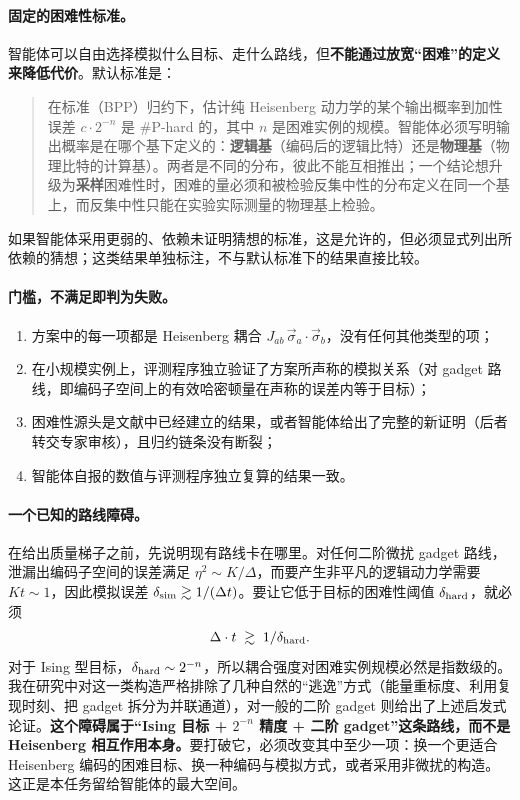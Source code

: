 \documentclass[11pt,a4paper,fontset=none]{ctexart}
\newcommand{\Heis}{\vec\sigma_a\!\cdot\!\vec\sigma_b}
\begin{document}
\paragraph{固定的困难性标准。}智能体可以自由选择模拟什么目标、走什么路线，但\textbf{不能通过放宽“困难”的定义来降低代价}。默认标准是：
\begin{quote}
在标准（BPP）归约下，估计纯 Heisenberg 动力学的某个输出概率到加性误差 $c\cdot 2^{-n}$ 是 \#P-hard 的，其中 $n$ 是困难实例的规模。智能体必须写明输出概率是在哪个基下定义的：\textbf{逻辑基}（编码后的逻辑比特）还是\textbf{物理基}（物理比特的计算基）。两者是不同的分布，彼此不能互相推出；一个结论想升级为\textbf{采样}困难性时，困难的量必须和被检验反集中性的分布定义在同一个基上，而反集中性只能在实验实际测量的物理基上检验。
\end{quote}
\noindent 如果智能体采用更弱的、依赖未证明猜想的标准，这是允许的，但必须显式列出所依赖的猜想；这类结果单独标注，不与默认标准下的结果直接比较。

\paragraph{门槛，不满足即判为失败。}
\begin{enumerate}[label=(\alph*)]
  \item 方案中的每一项都是 Heisenberg 耦合 $J_{ab}\,\Heis$，没有任何其他类型的项；
  \item 在小规模实例上，评测程序独立验证了方案所声称的模拟关系（对 gadget 路线，即编码子空间上的有效哈密顿量在声称的误差内等于目标）；
  \item 困难性源头是文献中已经建立的结果，或者智能体给出了完整的新证明（后者转交专家审核），且归约链条没有断裂；
  \item 智能体自报的数值与评测程序独立复算的结果一致。
\end{enumerate}

\paragraph{一个已知的路线障碍。}在给出质量梯子之前，先说明现有路线卡在哪里。对任何二阶微扰 gadget 路线，泄漏出编码子空间的误差满足 $\eta^2\sim K/\Delta$，而要产生非平凡的逻辑动力学需要 $Kt\sim 1$，因此模拟误差 $\delta_{\rm sim}\gtrsim 1/(\Delta t)$。要让它低于目标的困难性阈值 $\delta_{\rm hard}$，就必须
\[
  \Delta\cdot t \;\gtrsim\; 1/\delta_{\rm hard}.
\]
对于 Ising 型目标，$\delta_{\rm hard}\sim 2^{-n}$，所以耦合强度对困难实例规模必然是指数级的。我在研究中对这一类构造严格排除了几种自然的“逃逸”方式（能量重标度、利用复现时刻、把 gadget 拆分为并联通道），对一般的二阶 gadget 则给出了上述启发式论证。\textbf{这个障碍属于“Ising 目标 + $2^{-n}$ 精度 + 二阶 gadget”这条路线，而不是 Heisenberg 相互作用本身。}要打破它，必须改变其中至少一项：换一个更适合 Heisenberg 编码的困难目标、换一种编码与模拟方式，或者采用非微扰的构造。这正是本任务留给智能体的最大空间。
\end{document}
